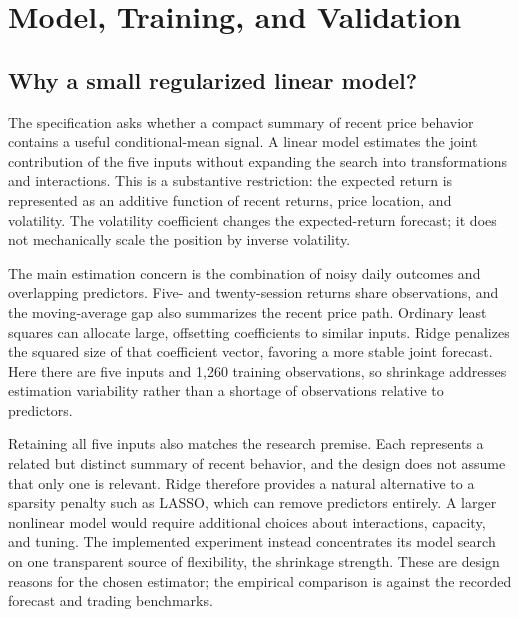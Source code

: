 \section{Model, Training, and Validation}
\label{sec:model}
\subsection{Why a small regularized linear model?}
The specification asks whether a compact summary of recent price behavior contains a useful conditional-mean signal. A linear model estimates the joint contribution of the five inputs without expanding the search into transformations and interactions. This is a substantive restriction: the expected return is represented as an additive function of recent returns, price location, and volatility. The volatility coefficient changes the expected-return forecast; it does not mechanically scale the position by inverse volatility.

The main estimation concern is the combination of noisy daily outcomes and overlapping predictors. Five- and twenty-session returns share observations, and the moving-average gap also summarizes the recent price path. Ordinary least squares can allocate large, offsetting coefficients to similar inputs. Ridge penalizes the squared size of that coefficient vector, favoring a more stable joint forecast. Here there are five inputs and 1,260 training observations, so shrinkage addresses estimation variability rather than a shortage of observations relative to predictors.

Retaining all five inputs also matches the research premise. Each represents a related but distinct summary of recent behavior, and the design does not assume that only one is relevant. Ridge therefore provides a natural alternative to a sparsity penalty such as LASSO, which can remove predictors entirely. A larger nonlinear model would require additional choices about interactions, capacity, and tuning. The implemented experiment instead concentrates its model search on one transparent source of flexibility, the shrinkage strength. These are design reasons for the chosen estimator; the empirical comparison is against the recorded forecast and trading benchmarks.

